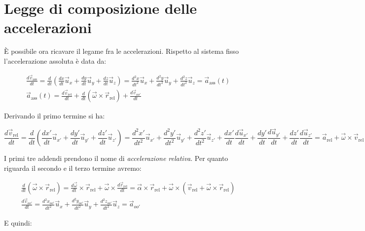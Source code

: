\begin{figure}[htpb]
\end{figure}

\section{Legge di composizione delle accelerazioni}

È possibile ora ricavare il legame fra le accelerazioni. Rispetto al sistema fisso l'accelerazione assoluta è data da:

\begin{gather*}
	\frac{d\vec{v}_{\text{ass} }}{dt}=\frac{d}{dt}\left(\frac{dx}{dt} \vec{u}_x + \frac{dy}{dt} \vec{u}_y+ \frac{dz}{dt} \vec{u}_z\right)=\frac{d^2x}{dt^2} \vec{u}_x+ \frac{d^2y}{dt^2} \vec{u}_y+\frac{d^2z}{dt^2} \vec{u}_z=\vec{a}_{\text{ass}} (t) \\
	\vec{a}_{\text{ass}}(t)=\frac{d\vec{v}_{\text{rel}}}{dt}+\frac{d}{dt}(\vec{\omega} \times \vec{r}_{\text{rel}})+\frac{d\vec{v}_{oo'}}{dt}
\end{gather*}

Derivando il primo termine si ha:

\[
	\frac{d\vec{v}_{\text{rel}}}{dt}=\frac{d}{dt}\left(\frac{dx'}{dt}\vec{u}_{x'}+\frac{dy'}{dt}\vec{u}_{y'}+\frac{dz'}{dt}\vec{u}_{z'}\right)=\frac{d^2x'}{dt^2} \vec{u}_{x'} + \frac{d^2y'}{dt^2} \vec{u}_{y'}+ \frac{d^2z'}{dt^2} \vec{u}_{z'} + \frac{dx'}{dt} \frac{d\vec{u}_{x'}}{dt}+ \frac{dy'}{dt} \frac{d\vec{u}_{y'}}{dt}+ \frac{dz'}{dt} \frac{d\vec{u}_{z'}}{dt}=\vec{a}_{\text{rel}}+\vec{\omega}\times\vec{v}_{\text{rel}}
\]

I primi tre addendi prendono il nome di \emph{accelerazione relativa}. Per quanto riguarda il secondo e il terzo termine avremo:

\begin{gather*}
	\frac{d}{dt}(\vec{\omega} \times \vec{r}_{\text{rel}})=\frac{d\vec{\omega}}{dt} \times \vec{r}_{\text{rel}}+\vec{\omega} \times \frac{d\vec{r}_{\text{rel}} }{dt} = \vec{\alpha} \times \vec{r}_{\text{rel}}+\vec{\omega} \times( \vec{v}_{\text{rel}}+\vec{\omega} \times \vec{r}_{\text{rel}}) \\
	\frac{d\vec{v}_{oo'}}{dt}= \frac{d^2x_{oo'}}{dt^2} \vec{u}_x+ \frac{d^2y_{oo'}}{dt^2} \vec{u}_y+ \frac{d^2z_{oo'}}{dt^2} \vec{u}_z=\vec{a}_{oo'}
\end{gather*}

E quindi:


